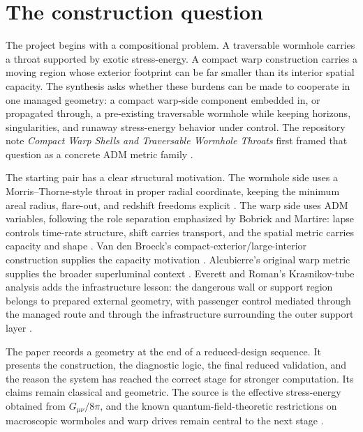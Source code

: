 \documentclass[11pt]{article}
\begin{document}
\section{The construction question}
The project begins with a compositional problem.  A traversable wormhole carries a throat supported by exotic stress-energy.  A compact warp construction carries a moving region whose exterior footprint can be far smaller than its interior spatial capacity.  The synthesis asks whether these burdens can be made to cooperate in one managed geometry: a compact warp-side component embedded in, or propagated through, a pre-existing traversable wormhole while keeping horizons, singularities, and runaway stress-energy behavior under control.  The repository note \emph{Compact Warp Shells and Traversable Wormhole Throats} first framed that question as a concrete ADM metric family \citep{goldman_compact_ansatz}.

The starting pair has a clear structural motivation.  The wormhole side uses a Morris--Thorne-style throat in proper radial coordinate, keeping the minimum areal radius, flare-out, and redshift freedoms explicit \citep{morris_thorne_1988}.  The warp side uses ADM variables, following the role separation emphasized by Bobrick and Martire: lapse controls time-rate structure, shift carries transport, and the spatial metric carries capacity and shape \citep{bobrick_martire_2021}.  Van den Broeck's compact-exterior/large-interior construction supplies the capacity motivation \citep{van_den_broeck_1999}.  Alcubierre's original warp metric supplies the broader superluminal context \citep{alcubierre_1994}.  Everett and Roman's Krasnikov-tube analysis adds the infrastructure lesson: the dangerous wall or support region belongs to prepared external geometry, with passenger control mediated through the managed route and through the infrastructure surrounding the outer support layer \citep{everett_roman_1997}.

The paper records a geometry at the end of a reduced-design sequence.  It presents the construction, the diagnostic logic, the final reduced validation, and the reason the system has reached the correct stage for stronger computation.  Its claims remain classical and geometric.  The source is the effective stress-energy obtained from $G_{\mu\nu}/8\pi$, and the known quantum-field-theoretic restrictions on macroscopic wormholes and warp drives remain central to the next stage \citep{ford_roman_1996,pfenning_ford_1997}.
\end{document}
